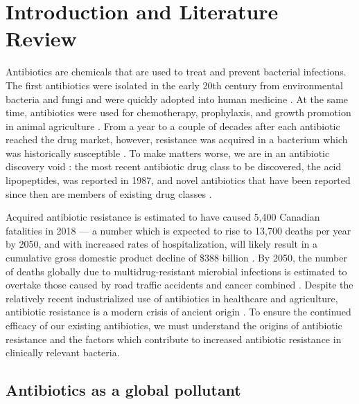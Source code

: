 \chapter{Introduction and Literature Review}

Antibiotics are chemicals that are used to treat and prevent bacterial infections.
The first antibiotics were isolated in the early 20th century from environmental bacteria and fungi and were quickly adopted into human medicine \parencite{Hutchings.2019}.
At the same time, antibiotics were used for chemotherapy, prophylaxis, and growth promotion in animal agriculture \parencite{Kirchhelle.2018}.
From a year to a couple of decades after each antibiotic reached the drug market, however, resistance was acquired in a bacterium which was historically susceptible \parencite{Ventola.2015}.
To make matters worse, we are in an antibiotic discovery void \parencite{Silver.2011}:
the most recent antibiotic drug class to be discovered, the acid lipopeptides, was reported in 1987, and novel antibiotics that have been reported since then are members of existing drug classes \parencite{Debono.1987}.

Acquired antibiotic resistance is estimated to have caused 5,400 Canadian fatalities in 2018 --- a number which is expected to rise to 13,700 deaths per year by 2050, and with increased rates of hospitalization, will likely result in a cumulative gross domestic product decline of \$388 billion \parencite{Finlay.2019}.
By 2050, the number of deaths globally due to multidrug-resistant microbial infections is estimated to overtake those caused by road traffic accidents and cancer combined \parencite{ONeill.2016}. Despite the relatively recent industrialized use of antibiotics in healthcare and agriculture, antibiotic resistance is a modern crisis of ancient origin \parencite{DCosta.2011}.
To ensure the continued efficacy of our existing antibiotics, we must understand the origins of antibiotic resistance and the factors which contribute to increased antibiotic resistance in clinically relevant bacteria.

\section{Antibiotics as a global pollutant}

